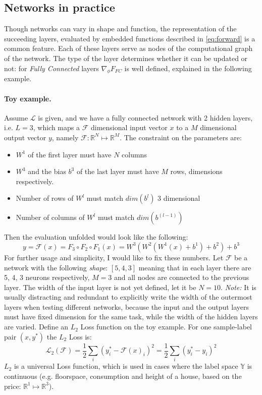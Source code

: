\subsection{Networks in practice} 
Though networks can vary in shape and function, the representation of the succeeding layers, evaluated by embedded functions described in \ref{eq:forward} is a common feature. Each of these layers serve as nodes of the computational graph of the network. The type of the layer determines whether it can be updated or not: for \emph{Fully Connected} layers $\nabla_\phi F_{FC}$ is well defined, explained in the following example.

\paragraph{Toy example.} 
Assume $\mathcal{L}$ is given, and we have a fully connected network with 2 hidden layers, i.e. $L=3$, which maps a $\mathcal{F}$ dimensional input vector $x$ to a $M$ dimensional output vector $y$, namely $\mathcal{F}:\mathbb{R}^N \mapsto \mathbb{R}^M$. The constraint on the parameters are:
\begin{itemize}
    \item[] $W^1$ of the first layer must have $N$ columns
    \item[] $W^3$ and the bias $b^3$ of the last layer must have $M$ rows, dimensions respectively.
    \item[] Number of rows of $W^l$ must match $dim(b^l)$ $3$ dimensional
    \item[] Number of columns of $W^l$ must match $dim(b^{(l-1)})$
\end{itemize} 
Then the evaluation unfolded would look like the following: 
$$y = \mathcal{F}(x) = F_3 \circ F_2 \circ F_1(x) = W^3(W^2(W^1(x)+b^1)+b^2)+b^3$$
For further usage and simplicity, I would like to fix these numbers.
Let $\mathcal{F}$ be a network with the following \emph{shape}: $\left[5, 4, 3\right] $
meaning that in each layer there are 5, 4, 3 neurons respectively, $M=3$ and all nodes are connected to the previous layer. The width of the input layer is not yet defined, let it be $N=10$. 
\emph{Note:} It is usually distracting and redundant to explicitly write the width of the outermost layers when testing different networks, because the input and the output layers must have fixed dimension for the same task, while the width of the hidden layers are varied.
Define an $L_2$ Loss function on the toy example. For one sample-label pair $(x,y^*)$ the $L_2$ Loss is:
\begin{equation}
    \mathcal{L}_2(\mathcal{F}) = \frac{1}{2} \sum_{i} (y_i^* - \mathcal{F}(x)_i)^2 = \frac{1}{2} \sum_{i} (y_i^* - y_i)^2
\end{equation}
$L_2$ is a universal Loss function, which is used in cases where the label space $\mathbb{Y}$ is continuous (e.g. floorspace, consumption and height of a house, based on the price: $\mathbb{R}^1 \mapsto \mathbb{R}^3$).

